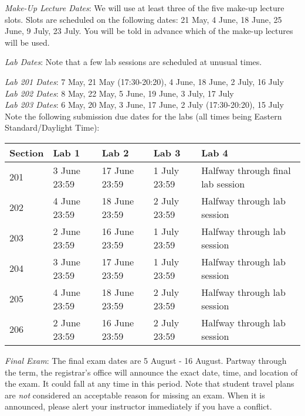 \documentclass[letterpaper,10pt]{article}
\begin{document}
\textit{Make-Up Lecture Dates}: We will use at least three of the five make-up lecture slots. Slots are scheduled on the following dates: 21 May, 4 June, 18 June, 25 June, 9 July, 23 July. You will be told in advance which of the make-up lectures will be used.

\textit{Lab Dates}: Note that a few lab sessions are scheduled at unusual times.

\textit{Lab 201 Dates}: 7 May, 21 May (17:30-20:20), 4 June, 18 June, 2 July, 16 July\\
\textit{Lab 202 Dates}: 8 May, 22 May, 5 June, 19 June, 3 July, 17 July\\
\textit{Lab 203 Dates}: 6 May, 20 May, 3 June, 17 June, 2 July (17:30-20:20), 15 July\\


Note the following submission due dates for the labs (all times being Eastern Standard/Daylight Time):\\


\begin{table}[h]
        \begin{center}
        \begin{tabular}{l|l|l|l|l}
        	\textbf{Section} & \textbf{Lab 1} & \textbf{Lab 2} & \textbf{Lab 3} & \textbf{Lab 4}\\
			\hline
			201 & 3 June 23:59 & 17 June 23:59 & 1 July 23:59 & Halfway through final lab session\\
			\hline
			202 & 4 June 23:59 & 18 June 23:59 & 2 July 23:59 & Halfway through lab session  \\
			\hline
			203 & 2 June 23:59 & 16 June 23:59 & 1 July 23:59 & Halfway through lab session  \\
			\hline
			204 & 3 June 23:59 & 17 June 23:59 & 1 July 23:59 & Halfway through lab session  \\
			\hline
			205 & 4 June 23:59 & 18 June 23:59 & 2 July 23:59 & Halfway through lab session  \\
			\hline
			206 & 2 June 23:59 & 16 June 23:59 & 2 July 23:59 & Halfway through lab session  \\
        \end{tabular}
        \end{center}
\end{table}

\textit{Final Exam}: The final exam dates are 5 August - 16 August. Partway through the term, the registrar's office will announce the exact date, time, and location of the exam. It could fall at any time in this period. Note that student travel plans are \emph{not} considered an acceptable reason for missing an exam. When it is announced, please alert your instructor immediately if you have a conflict.
\end{document}
